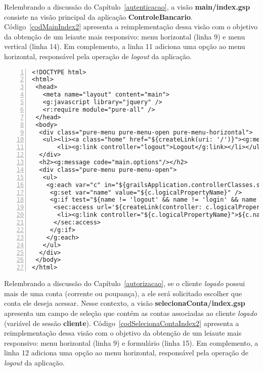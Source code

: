 \vspace{0.5cm}

Relembrando   a   discussão  do   Capítulo~\ref{autenticacao},   a  visão   {\bf
  main/index.gsp}    consiste   na   visão    principal   da    aplicação   {\bf
  ControleBancario}.   Código~\ref{codMainIndex2}  apresenta  a  reimplementação
dessa  visão com  o objetivo  da obtenção  de um  leiaute mais  responsivo: menu
horizontal (linha  9) e menu  vertical (linha 14).   Em complemento, a  linha 11
adiciona uma opção ao menu horizontal, responsável pela operação de {\it logout}
da aplicação.  

\begin{lstlisting}[numbers=left, caption=Visão {\bf main/index.gsp}, frame=trBL,
    float=htbp, label=codMainIndex2]
<!DOCTYPE html>
<html>
 <head>
   <meta name="layout" content="main">
   <g:javascript library="jquery" />
   <r:require module="pure-all" />
 </head>
 <body>
  <div class="pure-menu pure-menu-open pure-menu-horizontal">
   <ul><li><a class="home" href="${createLink(uri: '/')}"><g:message code="default.home.label"/></a></li>
       <li><g:link controller="logout">Logout</g:link></li></ul>
  </div>
  <h2><g:message code="main.options"/></h2>
  <div class="pure-menu pure-menu-open">
   <ul>
    <g:each var="c" in="${grailsApplication.controllerClasses.sort { it.fullName } }">
     <g:set var="name" value="${c.logicalPropertyName}" />
     <g:if test="${name != 'logout' && name != 'login' && name != 'main'}">
      <sec:access url='${createLink(controller: c.logicalPropertyName, base: "/")}'>
       <li><g:link controller="${c.logicalPropertyName}">${c.naturalName.replace("Controller","")}</g:link></li>
      </sec:access>
     </g:if>
    </g:each>
   </ul>
  </div>
 </body>
</html>
\end{lstlisting}

\vspace{0.5cm}

\noindent Relembrando  a discussão  do Capítulo~\ref{autorizacao}, se  o cliente
          {\it logado}  possui mais de uma  conta (corrente ou  poupança), a ele
          será  solicitado  escolher  que   conta  ele  deseja  acessar.   Nesse
          contexto, a visão {\bf selecionaConta/index.gsp} apresenta um campo de
          seleção  que  contém as  contas  associadas  ao  cliente {\it  logado}
          (variável                 de                sessão                {\bf
            cliente}).    Código~\ref{codSelecionaContaIndex2}    apresenta    a
          reimplementação dessa visão  com o objetivo da obtenção  de um leiaute
          mais responsivo:  menu horizontal (linha  9) e formulário  (linha 15).
          Em  complemento, a  linha 12  adiciona uma  opção ao  menu horizontal,
          responsável pela operação de {\it logout} da aplicação.  

